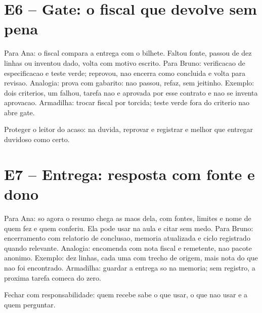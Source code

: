 \section{E6 -- Gate: o fiscal que devolve sem pena}


\begin{descricao}
Para Ana: o fiscal compara a entrega com o bilhete. Faltou fonte, passou de dez linhas ou inventou dado, volta com motivo escrito. Para Bruno: verificacao de especificacao e teste verde; reprovou, nao encerra como concluida e volta para revisao. Analogia: prova com gabarito: nao passou, refaz, sem jeitinho. Exemplo: dois criterios, um falhou, tarefa nao e aprovada por esse contrato e nao se inventa aprovacao. Armadilha: trocar fiscal por torcida; teste verde fora do criterio nao abre gate.
\end{descricao}

\begin{funcao}
Proteger o leitor do acaso: na duvida, reprovar e registrar e melhor que entregar duvidoso como certo.
\end{funcao}

\section{E7 -- Entrega: resposta com fonte e dono}


\begin{descricao}
Para Ana: so agora o resumo chega as maos dela, com fontes, limites e nome de quem fez e quem conferiu. Ela pode usar na aula e citar sem medo. Para Bruno: encerramento com relatorio de conclusao, memoria atualizada e ciclo registrado quando relevante. Analogia: encomenda com nota fiscal e remetente, nao pacote anonimo. Exemplo: dez linhas, cada uma com trecho de origem, mais nota do que nao foi encontrado. Armadilha: guardar a entrega so na memoria; sem registro, a proxima tarefa comeca do zero.
\end{descricao}

\begin{funcao}
Fechar com responsabilidade: quem recebe sabe o que usar, o que nao usar e a quem perguntar.
\end{funcao}

